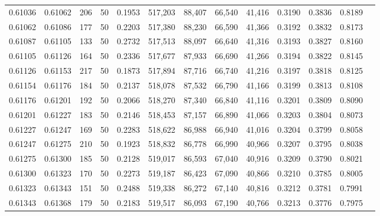 \begin{tabular}{rrrrrrrrrrrrr}
0.61036 & 0.61062 &   206 &  50 &                                     0.1953 & 517,203 &  88,407 &  66,540 &  41,416 & 0.3190 & 0.3836 & 0.8189 \\
0.61062 & 0.61086 &   177 &  50 &                                     0.2203 & 517,380 &  88,230 &  66,590 &  41,366 & 0.3192 & 0.3832 & 0.8173 \\
0.61087 & 0.61105 &   133 &  50 &                                     0.2732 & 517,513 &  88,097 &  66,640 &  41,316 & 0.3193 & 0.3827 & 0.8160 \\
0.61105 & 0.61126 &   164 &  50 &                                     0.2336 & 517,677 &  87,933 &  66,690 &  41,266 & 0.3194 & 0.3822 & 0.8145 \\
0.61126 & 0.61153 &   217 &  50 &                                     0.1873 & 517,894 &  87,716 &  66,740 &  41,216 & 0.3197 & 0.3818 & 0.8125 \\
0.61154 & 0.61176 &   184 &  50 &                                     0.2137 & 518,078 &  87,532 &  66,790 &  41,166 & 0.3199 & 0.3813 & 0.8108 \\
0.61176 & 0.61201 &   192 &  50 &                                     0.2066 & 518,270 &  87,340 &  66,840 &  41,116 & 0.3201 & 0.3809 & 0.8090 \\
0.61201 & 0.61227 &   183 &  50 &                                     0.2146 & 518,453 &  87,157 &  66,890 &  41,066 & 0.3203 & 0.3804 & 0.8073 \\
0.61227 & 0.61247 &   169 &  50 &                                     0.2283 & 518,622 &  86,988 &  66,940 &  41,016 & 0.3204 & 0.3799 & 0.8058 \\
0.61247 & 0.61275 &   210 &  50 &                                     0.1923 & 518,832 &  86,778 &  66,990 &  40,966 & 0.3207 & 0.3795 & 0.8038 \\
0.61275 & 0.61300 &   185 &  50 &                                     0.2128 & 519,017 &  86,593 &  67,040 &  40,916 & 0.3209 & 0.3790 & 0.8021 \\
0.61300 & 0.61323 &   170 &  50 &                                     0.2273 & 519,187 &  86,423 &  67,090 &  40,866 & 0.3210 & 0.3785 & 0.8005 \\
0.61323 & 0.61343 &   151 &  50 &                                     0.2488 & 519,338 &  86,272 &  67,140 &  40,816 & 0.3212 & 0.3781 & 0.7991 \\
0.61343 & 0.61368 &   179 &  50 &                                     0.2183 & 519,517 &  86,093 &  67,190 &  40,766 & 0.3213 & 0.3776 & 0.7975 \\

\end{tabular}
